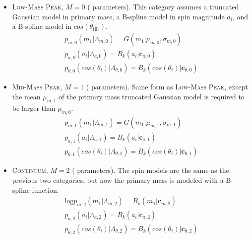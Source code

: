 \begin{itemize}
    \item \textsc{Low-Mass Peak}, $M=0$ ( parameters). This category assumes a truncated Gaussian model in primary mass, a B-spline model in spin magnitude $a_i$, and a B-spline model in $cos(\theta_{\text{tilt}})$. 
    \begin{eqnarray} \label{eq:lowmass}
        p_{m,0}(m_1| \Lambda_{m,0}) = G(m_1 | \mu_{m,0}, \sigma_{m,0}) \\
        p_{a,0}(a_i| \Lambda_{a,0}) = B_k(a_i | \mathbf{c}_{a,0}) \\
        p_{\theta,0}(cos(\theta_i)| \Lambda_{\theta,0}) = B_k( cos(\theta_i) | \mathbf{c}_{\theta,0})
    \end{eqnarray}

    \item \textsc{Mid-Mass Peak}, $M=1$ ( parameters). Same form as \textsc{Low-Mass Peak}, except the mean $\mu_{m,1}$ of the primary mass truncated Gaussian model is required to be larger than $\mu_{m,0}$.
    \begin{eqnarray} \label{eq:midmass}
        p_{m,1}(m_1| \Lambda_{m,1}) = G(m_1 | \mu_{m,1}, \sigma_{m,1}) \\
        p_{a,1}(a_i| \Lambda_{a,1}) = B_k(a_i | \mathbf{c}_{a,1}) \\
        p_{\theta,1}(cos(\theta_i)| \Lambda_{\theta,1}) = B_k( cos(\theta_i) | \mathbf{c}_{\theta,1})
    \end{eqnarray}

    \item \textsc{Continuum}, $M=2$ ( parameters). The spin models are the same as the previous two categories, but now the primary mass is modeled with a B-spline function. 
    \begin{eqnarray} \label{eq:contmass}
        \text{log} p_{m,2}(m_1| \Lambda_{m,2}) = B_k(m_1 | \mathbf{c}_{m, 2}) \\
        p_{a,2}(a_i| \Lambda_{a,2}) = B_k(a_i | \mathbf{c}_{a,2}) \\
        p_{\theta,2}(cos(\theta_i)| \Lambda_{\theta,2}) = B_k( cos(\theta_i) | \mathbf{c}_{\theta,2})
    \end{eqnarray}
    
\end{itemize}
